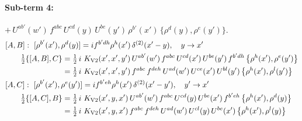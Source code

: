 \documentclass[10pt]{article}
\numberwithin{equation}{section}
\begin{document}
\paragraph{Sub-term 4:} $+\,U^{ab'}(w')\,f^{abc}\,U^{cd}(y)\,U^{be}(y')\,\rho^{b'}(x')\,\big\{\rho^{d}(y),\rho^{e}(y')\big\}$.
\begin{align}
&[A,B]:\ [\rho^{b'}(x'),\rho^{d}(y)]=i f^{b'dh}\rho^{h}(x')\,\delta^{(2)}(x'-y),\quad y\to x'\notag\\
&\qquad \tfrac12\{[A,B],C\}=\tfrac12\,i\,\,K_{\rm V2}(x',x',y')\,U^{ab'}(w')\,f^{abc}\,U^{cd}(x')\,U^{be}(y')\,f^{b'dh}\,\big\{\rho^{h}(x'),\rho^{e}(y')\big\}\notag\\
&\qquad\phantom{\tfrac12\{[A,B],C\}}=\tfrac12\,i\,\,K_{\rm V2}(x',x',y')\,f^{abc}\,f^{deh}\,U^{ad}(w')\,U^{ce}(x')\,U^{bl}(y')\,\big\{\rho^{h}(x'),\rho^{l}(y')\big\}
\label{eq:GI.V2-4-AB}\\
&[A,C]:\ [\rho^{b'}(x'),\rho^{e}(y')]=i f^{b'eh}\rho^{h}(x')\,\delta^{(2)}(x'-y'),\quad y'\to x'\notag\\
&\qquad \tfrac12\{[A,C],B\}=\tfrac12\,i\,\,K_{\rm V2}(x',y,x')\,U^{ab'}(w')\,f^{abc}\,U^{cd}(y)\,U^{be}(x')\,f^{b'eh}\,\big\{\rho^{h}(x'),\rho^{d}(y)\big\}\notag\\
&\qquad\phantom{\tfrac12\{[A,C],B\}}=\tfrac12\,i\,\,K_{\rm V2}(x',y,x')\,f^{abc}\,f^{deh}\,U^{ad}(w')\,U^{cl}(y)\,U^{be}(x')\,\big\{\rho^{h}(x'),\rho^{l}(y)\big\}
\label{eq:GI.V2-4-AC}
\end{align}
\end{document}
